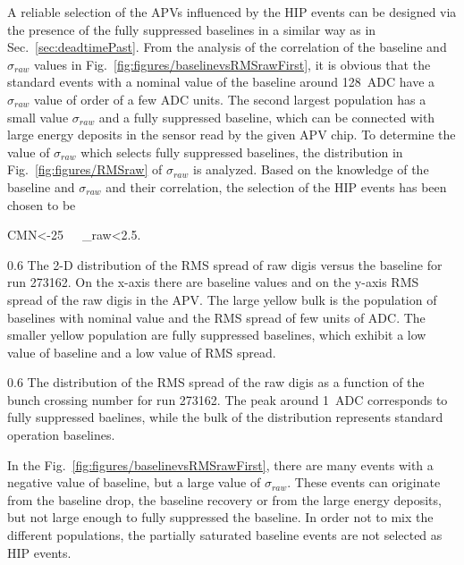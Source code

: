 A reliable selection of the APVs influenced by the HIP events can be designed via the presence of the fully suppressed baselines in a similar way as in Sec.~\ref{sec:deadtimePast}. From the analysis of the correlation of the baseline and $\sigma_{raw}$ values in Fig.~\ref{fig:figures/baselinevsRMSrawFirst}, it is obvious that the standard events with a nominal value of the baseline around 128~ADC have a $\sigma_{raw}$ value of order of a few ADC units.  The second largest population has a small value $\sigma_{raw}$ and a fully suppressed baseline, which can be connected with large energy deposits in the sensor read by the given APV chip. To determine the value of $\sigma_{raw}$ which selects fully suppressed baselines, the distribution in Fig.~\ref{fig:figures/RMSraw} of $\sigma_{raw}$ is analyzed. Based on the knowledge of the baseline and $\sigma_{raw}$ and their correlation, the selection of the HIP events has been chosen to be 

{
CMN<-25~~~\sigma_{raw}<2.5.
}


                 {0.6}       %
                 {The 2-D distribution of the RMS spread of raw digis versus the baseline for run 273162. On the x-axis there are baseline values and on the y-axis RMS spread of the raw digis in the APV. The large yellow bulk is the population of baselines with nominal value and the RMS spread of few units of ADC. The smaller yellow population are fully suppressed baselines, which exhibit a low value of baseline and a low value of RMS spread. } %

                 {0.6}       %
                 {The distribution of the RMS spread of the raw digis as a function of the bunch crossing number for run 273162. The peak around 1~ADC corresponds to fully suppressed baelines, while the bulk of the distribution represents standard operation baselines.  } %

In the Fig.~\ref{fig:figures/baselinevsRMSrawFirst}, there are many events with a negative value of baseline, but a large value of $\sigma_{raw}$. These events can originate from the baseline drop, the baseline recovery or from the large energy deposits, but not large enough to fully suppressed the baseline. In order not to mix the different populations, the partially saturated baseline events are not selected as HIP events. 

